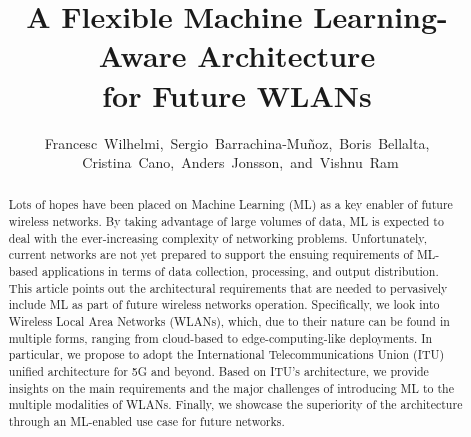 \documentclass{article}
\begin{document}
\title{A Flexible Machine Learning-Aware Architecture\\ for Future WLANs}
\author{Francesc~Wilhelmi,~Sergio~Barrachina-Mu\~noz,~Boris~Bellalta,\\~Cristina~Cano,~Anders~Jonsson,~and~Vishnu~Ram}
\date{ }
\maketitle

\begin{abstract}
Lots of hopes have been placed on Machine Learning (ML) as a key enabler of future wireless networks. By taking advantage of large volumes of data, ML is expected to deal with the ever-increasing complexity of networking problems. Unfortunately, current networks are not yet prepared to support the ensuing requirements of ML-based applications in terms of data collection, processing, and output distribution. This article points out the architectural requirements that are needed to pervasively include ML as part of future wireless networks operation. Specifically, we look into Wireless Local Area Networks (WLANs), which, due to their nature can be found in multiple forms, ranging from cloud-based to edge-computing-like deployments. In particular, we propose to adopt the International Telecommunications Union (ITU) unified architecture for 5G and beyond. Based on ITU's architecture, we provide insights on the main requirements and the major challenges of introducing ML to the multiple modalities of WLANs. Finally, we showcase the superiority of the architecture through an ML-enabled use case for future networks.
\end{abstract}
\end{document}
